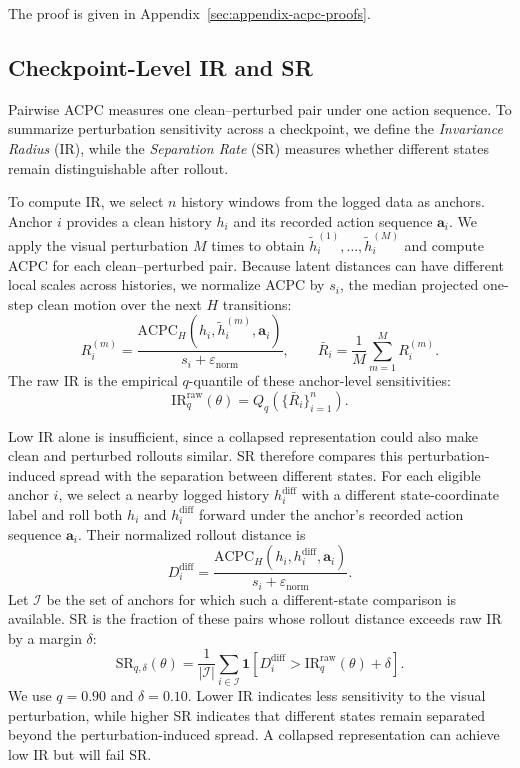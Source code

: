 \documentclass{article}
\begin{document}
The proof is given in Appendix~\ref{sec:appendix-acpc-proofs}.

\subsection{Checkpoint-Level IR and SR}
\label{sec:acpc-ir-sr}

Pairwise ACPC measures one clean--perturbed pair under one action sequence.
To summarize perturbation sensitivity across a checkpoint, we define the
\emph{Invariance Radius} (IR), while the \emph{Separation Rate} (SR) measures
whether different states remain distinguishable after rollout.

To compute IR, we select $n$ history windows from the logged data as anchors.
Anchor $i$ provides a clean history $h_i$ and its recorded action sequence
$\mathbf a_i$. We apply the visual perturbation $M$ times to obtain
$\tilde h_i^{(1)},\ldots,\tilde h_i^{(M)}$ and compute ACPC for each
clean--perturbed pair. Because latent distances can have different local
scales across histories, we normalize ACPC by $s_i$, the median projected
one-step clean motion over the next $H$ transitions:
\begin{equation}
R_i^{(m)}
=
\frac{
\mathrm{ACPC}_H(h_i,\tilde h_i^{(m)},\mathbf a_i)
}{
s_i+\varepsilon_{\mathrm{norm}}
},
\qquad
\bar R_i=\frac{1}{M}\sum_{m=1}^{M}R_i^{(m)}.
\label{eq:normalized-same-state-radius}
\end{equation}
The raw IR is the empirical $q$-quantile of these anchor-level sensitivities:
\begin{equation}
\mathrm{IR}^{\mathrm{raw}}_q(\theta)
=
Q_q\!\left(\{\bar R_i\}_{i=1}^{n}\right).
\label{eq:ir-raw}
\end{equation}

Low IR alone is insufficient, since a collapsed representation could also make
clean and perturbed rollouts similar. SR therefore compares this
perturbation-induced spread with the separation between different states.
For each eligible anchor $i$, we select a nearby logged history
$h_i^{\mathrm{diff}}$ with a different state-coordinate label and roll both
$h_i$ and $h_i^{\mathrm{diff}}$ forward under the anchor's recorded action
sequence $\mathbf a_i$. Their normalized rollout distance is
\begin{equation}
D_i^{\mathrm{diff}}
=
\frac{
\mathrm{ACPC}_H(h_i, h_i^{\mathrm{diff}},\mathbf a_i)
}{
s_i+\varepsilon_{\mathrm{norm}}
}.
\label{eq:different-state-distance}
\end{equation}
Let $\mathcal I$ be the set of anchors for which such a different-state
comparison is available. SR is the fraction of these pairs whose rollout
distance exceeds raw IR by a margin $\delta$:
\begin{equation}
\mathrm{SR}_{q,\delta}(\theta)
=
\frac{1}{|\mathcal I|}
\sum_{i\in\mathcal I}
\mathbf 1\!\left[
D_i^{\mathrm{diff}}
>
\mathrm{IR}^{\mathrm{raw}}_q(\theta)+\delta
\right].
\label{eq:sr}
\end{equation}
We use $q=0.90$ and $\delta=0.10$. Lower IR indicates less sensitivity to the
visual perturbation, while higher SR indicates that different states remain
separated beyond the perturbation-induced spread. A collapsed representation
can achieve low IR but will fail SR.
\end{document}
